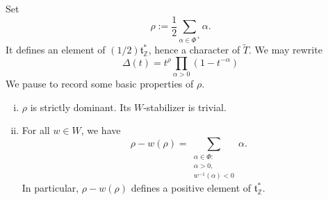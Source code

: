 \documentclass[reqno]{amsart} 
\begin{document}
Set
\begin{equation*}
  \rho := \frac{1}{2} \sum_{\alpha \in \Phi^+} \alpha.
\end{equation*}
It defines an element of $(1/2) \mathfrak{t}_{\mathbb{Z}}^*$, hence a character of $\tilde{T}$.  We may rewrite
\begin{equation*}
  \Delta(t) =
  t^{\rho}
  \prod_{\alpha > 0}
  (1 - t^{-\alpha})
\end{equation*}
We pause to record some basic properties of $\rho$.
\begin{lemma}\label{lem:rho-basic-props}
  \begin{enumerate}
[(i)]
  \item $\rho$ is strictly dominant.  Its $W$-stabilizer is trivial.
  \item For all $w \in W$, we have
    \begin{equation}\label{eqn:formula-for-rho-minus-w-rho}
      \rho - w(\rho)
      = \sum_{
        \substack{
          \alpha \in \Phi : \\
          \alpha > 0, \\
          w^{-1}(\alpha) < 0
        }
      }
      \alpha.        
    \end{equation}
    In particular, $\rho - w(\rho)$ defines a positive element of $\mathfrak{t}_{\mathbb{Z}}^*$.
  \end{enumerate}
\end{lemma}
\end{document}
